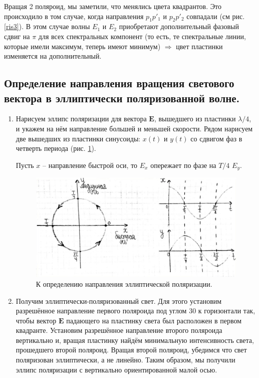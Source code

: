 \documentclass[a4paper, 12pt, twoside]{article}
\begin{document}
Вращая 2 поляроид, мы заметили, что менялись цвета квадрантов. Это происходило в том случае, когда направления $p_1p'_1$ и $p_2p'_2$ совпадали (см рис. \ref{ris3}). В этом случае волны $E_1$ и $E_2$ приобретают дополнительный фазовый сдвиг на $\pi$ для всех спектральных компонент (то есть, те спектральные линии, которые имели максимум, теперь имеют минимум) $\Rightarrow$ цвет пластинки изменяется на дополнительный.

\subsection{Определение направления вращения светового вектора в эллиптически поляризованной волне. }

\begin{enumerate}
	\item Нарисуем эллипс поляризации для вектора $\mathbf{E}$, вышедшего из пластинки $\lambda/4$, и укажем на нём направление большей и меньшей скорости. Рядом нарисуем две вышедших из пластинки синусоиды: $x(t)$ и $y(t)$ со сдвигом фаз в четверть периода (рис. \ref{ris4}).
	
	Пусть $x$ -- направление быстрой оси, то $E_x$ опережает по фазе на $T/4$ $E_y$. 
	
	\begin{figure}[H]
		\centering
		\includegraphics[width =  0.7\linewidth]{ris4}
		\caption{К определению направления эллиптической поляризации.}
		\label{ris4}
	\end{figure} 

	\item Получим эллиптически-поляризованный свет. Для этого установим разрешённое направление первого поляроида под углом 30 \degree к горизонтали так, чтобы вектор $\mathbf{E}$ падающего на пластинку света был расположен в первом квадранте. Установим разрешённое направление второго поляроида вертикально и, вращая пластинку найдём минимальную интенсивность света, прошедшего второй поляроид. Вращая второй поляроид, убедимся что свет поляризован эллиптически, а не линейно. Таким образом, мы получили эллипс поляризации с вертикально ориентированной малой осью.
	

\end{enumerate}
\end{document}
